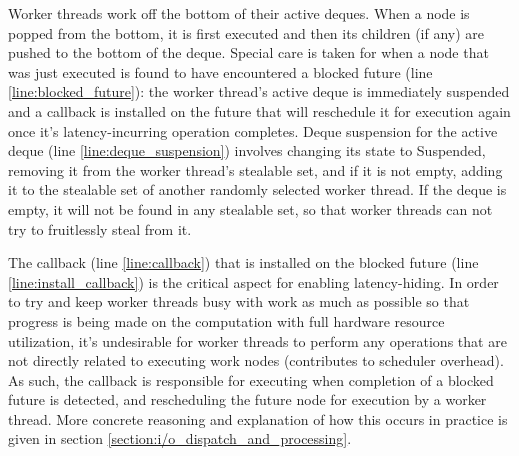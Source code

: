 \documentclass[bsc,frontabs,singlespacing,parskip,deptreport,normalheadings]{infthesis}
\begin{document}
Worker threads work off the bottom of their active deques. When a node is popped
from the bottom, it is first executed and then its children (if any) are pushed
to the bottom of the deque. Special care is taken for when a node that was just
executed is found to have encountered a blocked future (line
\ref{line:blocked_future}): the worker thread's active deque is immediately
suspended and a callback is installed on the future that will reschedule it for
execution again once it's latency-incurring operation completes. Deque
suspension for the active deque (line \ref{line:deque_suspension}) involves
changing its state to Suspended, removing it from the worker thread's stealable
set, and if it is not empty, adding it to the stealable set of another randomly
selected worker thread. If the deque is empty, it will not be found in any
stealable set, so that worker threads can not try to fruitlessly steal from it. 

The callback (line \ref{line:callback}) that is installed on the blocked future
(line \ref{line:install_callback}) is the critical aspect for enabling
latency-hiding. In order to try and keep worker threads busy with work as much
as possible so that progress is being made on the computation with full hardware
resource utilization, it's undesirable for worker threads to perform any
operations that are not directly related to executing work nodes (contributes to
scheduler overhead). As such, the callback is responsible for executing when
completion of a blocked future is detected, and rescheduling the future node for
execution by a worker thread. More concrete reasoning and explanation of how
this occurs in practice is given in section
\ref{section:i/o_dispatch_and_processing}.
\end{document}
